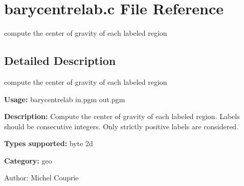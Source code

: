 \section{barycentrelab.c File Reference}
\label{barycentrelab_8c}
compute the center of gravity of each labeled region  




\label{_details}
\subsection{Detailed Description}
compute the center of gravity of each labeled region 

{\bf Usage:} barycentrelab in.pgm out.pgm

{\bf Description:} Compute the center of gravity of each labeled region. Labels should be consecutive integers. Only strictly positive labels are considered.

{\bf Types supported:} byte 2d

{\bf Category:} geo

\begin{Desc}
\item[Author:]Michel Couprie \end{Desc}
